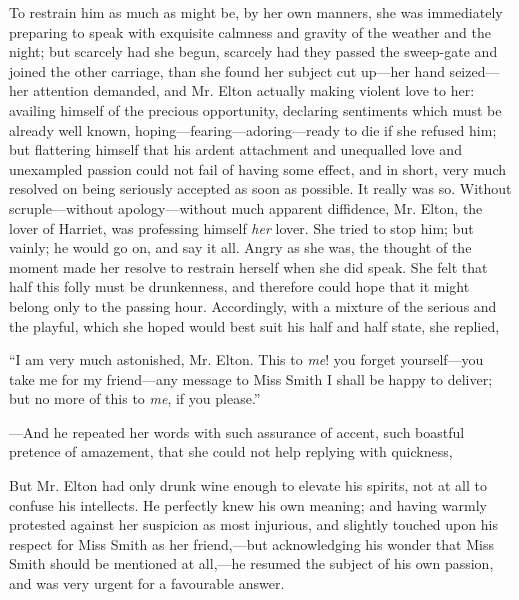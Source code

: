 To restrain him as much as might be, by her own manners, she was immediately preparing to speak with exquisite calmness and gravity of the weather and the night; but scarcely had she begun, scarcely had they passed the sweep-gate and joined the other carriage, than she found her subject cut up---her hand seized---her attention demanded, and Mr. Elton actually making violent love to her: availing himself of the precious opportunity, declaring sentiments which must be already well known, hoping---fearing---adoring---ready to die if she refused him; but flattering himself that his ardent attachment and unequalled love and unexampled passion could not fail of having some effect, and in short, very much resolved on being seriously accepted as soon as possible. It really was so. Without scruple---without apology---without much apparent diffidence, Mr. Elton, the lover of Harriet, was professing himself {\em her} lover. She tried to stop him; but vainly; he would go on, and say it all. Angry as she was, the thought of the moment made her resolve to restrain herself when she did speak. She felt that half this folly must be drunkenness, and therefore could hope that it might belong only to the passing hour. Accordingly, with a mixture of the serious and the playful, which she hoped would best suit his half and half state, she replied,

“I am very much astonished, Mr. Elton. This to {\em me}! you forget yourself---you take me for my friend---any message to Miss Smith I shall be happy to deliver; but no more of this to {\em me}, if you please.”

---And he repeated her words with such assurance of accent, such boastful pretence of amazement, that she could not help replying with quickness,


But Mr. Elton had only drunk wine enough to elevate his spirits, not at all to confuse his intellects. He perfectly knew his own meaning; and having warmly protested against her suspicion as most injurious, and slightly touched upon his respect for Miss Smith as her friend,---but acknowledging his wonder that Miss Smith should be mentioned at all,---he resumed the subject of his own passion, and was very urgent for a favourable answer.

